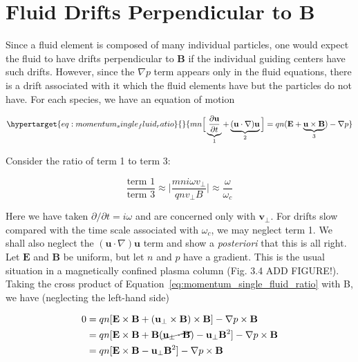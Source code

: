 \documentclass[
  notoc %
]{tufte-book}
\begin{document}
\hypertarget{fluid-drifts-perpendicular-to-b}{%
\section{Fluid Drifts Perpendicular to
B}\label{fluid-drifts-perpendicular-to-b}}

Since a fluid element is composed of many individual particles, one
would expect the fluid to have drifts perpendicular to \(\mathbf{B}\) if
the individual guiding centers have such drifts. However, since the
\(\nabla p\) term appears only in the fluid equations, there is a drift
associated with it which the fluid elements have but the particles do
not have. For each species, we have an equation of motion

\begin{equation}\protect\hypertarget{eq:momentum_single_fluid_ratio}{}{
mn\Big[ \underbrace{\frac{\partial\mathbf{u}}{\partial t}}_{1}+\underbrace{(\mathbf{u}\cdot\nabla)\mathbf{u}}_{2}\Big] = q n (\mathbf{E}+\underbrace{\mathbf{u}\times\mathbf{B}}_{3}) - \nabla p
}\label{eq:momentum_single_fluid_ratio}\end{equation}

Consider the ratio of term 1 to term 3:

\[
\frac{\text{term }1}{\text{term }3} \approx \bigg\lvert\frac{mni\omega v_\perp}{qnv_\perp B}\bigg\rvert \approx \frac{\omega}{\omega_c}
\]

Here we have taken \(\partial/\partial t=i\omega\) and are concerned
only with \(\mathbf{v}_\perp\). For drifts slow compared with the time
scale associated with \(\omega_c\), we may neglect term 1. We shall also
neglect the \((\mathbf{u}\cdot\nabla)\mathbf{u}\) term and show a
\emph{posteriori} that this is all right. Let \(\mathbf{E}\) and
\(\mathbf{B}\) be uniform, but let \(n\) and \(p\) have a gradient. This
is the usual situation in a magnetically confined plasma column (Fig.
3.4 ADD FIGURE!). Taking the cross product of
Equation~\ref{eq:momentum_single_fluid_ratio} with B, we have
(neglecting the left-hand side)

\[
\begin{aligned}
0 &= qn[\mathbf{E}\times\mathbf{B}+(\mathbf{u}_\perp\times\mathbf{B})\times\mathbf{B}] - \nabla p\times\mathbf{B} \\
&= qn[\mathbf{E}\times\mathbf{B}+\mathbf{B}(\cancel{\mathbf{u}_\perp\cdot\mathbf{B}})-\mathbf{u}_\perp\mathbf{B}^2] - \nabla p\times\mathbf{B} \\
&= qn[\mathbf{E}\times\mathbf{B}-\mathbf{u}_\perp\mathbf{B}^2] - \nabla p\times\mathbf{B}
\end{aligned}
\]
\end{document}
